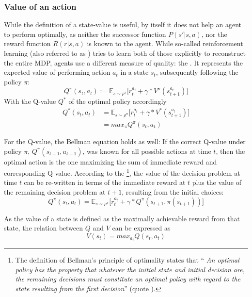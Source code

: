 \subsubsection{Value of an action}
While the definition of a state-value is useful, by itself it does not help an agent to perform optimally, as neither the successor function $P(s'|s,a)$, nor the reward function $R(r|s,a)$ is known to the agent. While so-called  reinforcement learning (also referred to as ) tries to learn both of those explicitly to reconstruct the entire MDP,  agents use a different measure of quality: the . It represents the expected value of performing action $a_t$ in a state $s_t$, subsequently following the policy $\pi$:
\begin{equation} \label{eq:1.2}
	Q^\pi(s_t,a_t) :=  \mathds{E}_{s\sim\rho^\pi} \big[ r_t^{a_t} + \gamma * V^\pi(s_{t+1}^{a_t}) \big]
\end{equation}
With the Q-value $Q^*$ of the optimal policy accordingly 
\begin{align*}
	Q^*(s_t,a_t) &=  \mathds{E}_{s\sim\rho^\pi} \big[ r_t^{a_t} + \gamma * V^*(s_{t+1}^{a_t}) \big] \\
	&= max_\pi Q^\pi(s_t,a_t)
\end{align*}

For the Q-value, the Bellman equation holds as well: If the correct Q-value under policy $\pi$, $Q^\pi(s_{t+1},a_{t+1})$, was known for all possible actions at time $t$, then the optimal action is the one maximizing the sum of immediate reward and corresponding Q-value. According to the \footnote{The definition of Bellman's principle of optimality states that ``\kern-2pt \textit{An optimal policy has the property that whatever the initial state and initial decision are, the remaining decisions must constitute an optimal policy with regard to the state resulting from the first decision}''  (quote \cite{bellman_dynamic_nodate}).}, the value of the decision problem at time $t$ can be re-written in terms of the immediate reward at $t$ plus the value of the remaining decision problem at $t+1$, resulting from the initial choices:
\begin{equation} \label{bellman}
	Q^\pi(s_t,a_t) =  \mathds{E}_{s\sim\rho^\pi} \big[r_t^{a_t} + \gamma *  Q^\pi(s_{t+1},\pi(s_{t+1}))  \big]
\end{equation}

As the value of a state is defined as the maximally achievable reward from that state, the relation between $Q$ and $V$ can be expressed as
\begin{equation} \label{eq:QandV}
V(s_t) = max_{a_t} Q(s_t, a_t)
\end{equation}

